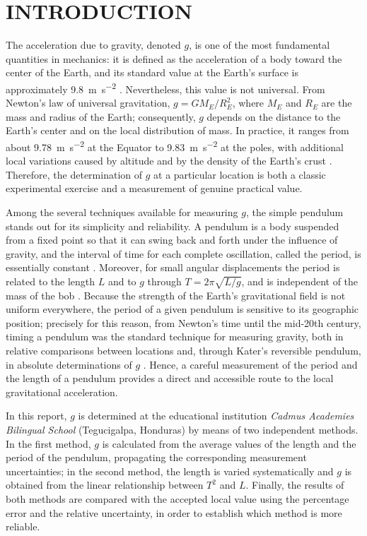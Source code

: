\documentclass[11pt,a4paper]{article}
\begin{document}
\section{INTRODUCTION}

The acceleration due to gravity, denoted $g$, is one of the most
fundamental quantities in mechanics: it is defined as the acceleration of
a body toward the center of the Earth, and its standard value at the
Earth's surface is approximately \qty{9.8}{\m\per\s\squared}
\citep{sciencedirect2026gravaccel, nordtvedt2026gravity}. Nevertheless,
this value is not universal. From Newton's law of universal gravitation,
$g = GM_E/R_E^{2}$, where $M_E$ and $R_E$ are the mass and radius of the
Earth; consequently, $g$ depends on the distance to the Earth's center and
on the local distribution of mass. In practice, it ranges from about
\qty{9.78}{\m\per\s\squared} at the Equator to
\qty{9.83}{\m\per\s\squared} at the poles, with additional local
variations caused by altitude and by the density of the Earth's crust
\citep{nordtvedt2026gravity}. Therefore, the determination of $g$ at a
particular location is both a classic experimental exercise and a
measurement of genuine practical value.

Among the several techniques available for measuring $g$, the simple
pendulum stands out for its simplicity and reliability. A pendulum is a
body suspended from a fixed point so that it can swing back and forth
under the influence of gravity, and the interval of time for each complete
oscillation, called the period, is essentially constant
\citep{britannica2026pendulum}. Moreover, for small angular displacements
the period is related to the length $L$ and to $g$ through
$T = 2\pi\sqrt{L/g}$, and is independent of the mass of the bob
\citep{britannica2026pendulum, serway2013physics}. Because the strength of
the Earth's gravitational field is not uniform everywhere, the period of a
given pendulum is sensitive to its geographic position; precisely for this
reason, from Newton's time until the mid-20th century, timing a pendulum
was the standard technique for measuring gravity, both in relative
comparisons between locations and, through Kater's reversible pendulum, in
absolute determinations of $g$ \citep{nordtvedt2026gravity,
britannica2026pendulum}. Hence, a careful measurement of the period and
the length of a pendulum provides a direct and accessible route to the
local gravitational acceleration.

In this report, $g$ is determined at the educational institution
\emph{Cadmus Academies Bilingual School} (Tegucigalpa, Honduras) by means
of two independent methods. In the first method, $g$ is calculated from
the average values of the length and the period of the pendulum,
propagating the corresponding measurement uncertainties; in the second
method, the length is varied systematically and $g$ is obtained from the
linear relationship between $T^{2}$ and $L$. Finally, the results of both
methods are compared with the accepted local value using the percentage
error and the relative uncertainty, in order to establish which method is
more reliable.
\end{document}
